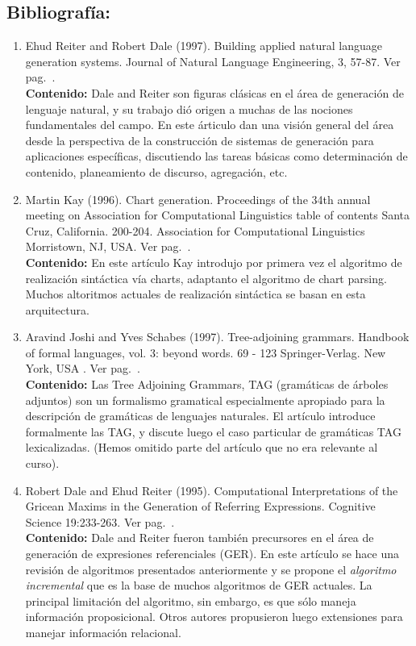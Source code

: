 \documentclass[a4paper]{article}
\begin{document}
\subsection*{Bibliograf\'ia:}
\begin{enumerate}
\item Ehud Reiter and Robert Dale (1997). Building applied natural language generation systems. Journal of Natural Language Engineering, 3, 57-87. Ver pag.~\pageref{jnle97}.\\
\textbf{Contenido:} Dale and Reiter son figuras cl\'asicas en el \'area de generaci\'on de lenguaje natural, y su trabajo di\'o origen a muchas de las nociones fundamentales del campo.  En este \'articulo dan una visi\'on general del \'area desde la perspectiva de la construcci\'on de sistemas de generaci\'on para aplicaciones espec\'ificas, discutiendo las tareas b\'asicas como determinaci\'on de contenido, planeamiento de discurso, agregaci\'on, etc.     

\item Martin Kay (1996). Chart generation.
Proceedings of the 34th annual meeting on Association for Computational Linguistics table of contents
Santa Cruz, California.  200-204.
Association for Computational Linguistics  Morristown, NJ, USA. Ver pag.~\pageref{kay96}.\\
\textbf{Contenido:} En este art\'iculo Kay introdujo por primera vez el algoritmo de realizaci\'on sint\'actica v\'ia charts, adaptanto el algoritmo de chart parsing.  Muchos altoritmos actuales de realizaci\'on sint\'actica se basan en esta arquitectura.  

\item Aravind Joshi and Yves Schabes (1997). 	
Tree-adjoining grammars.
Handbook of formal languages, vol. 3: beyond words. 69 - 123  
Springer-Verlag.  New York, USA . Ver pag.~\pageref{joshi}.\\
\textbf{Contenido:} Las Tree Adjoining Grammars, TAG (gram\'aticas de \'arboles adjuntos) son un formalismo gramatical especialmente apropiado para la descripci\'on de gram\'aticas de lenguajes naturales.  El art\'iculo introduce formalmente las TAG, y discute luego el caso particular de gram\'aticas TAG lexicalizadas. (Hemos omitido parte del art\'iculo que no era relevante al curso).    

\item Robert Dale and Ehud Reiter (1995). Computational Interpretations of the Gricean Maxims in the Generation of Referring Expressions. Cognitive Science 19:233-263. Ver pag.~\pageref{cogsci95}.\\
\textbf{Contenido:} Dale and Reiter fueron tambi\'en precursores en el \'area de generaci\'on de expresiones referenciales (GER). En este art\'iculo se hace una revisi\'on de algoritmos presentados anteriormente y se propone el \emph{algoritmo incremental} que es la base de muchos algoritmos de GER actuales.  La principal limitaci\'on del algoritmo, sin embargo, es que s\'olo maneja informaci\'on proposicional.  Otros autores propusieron luego extensiones para manejar informaci\'on relacional.  
\end{enumerate}
\end{document}
